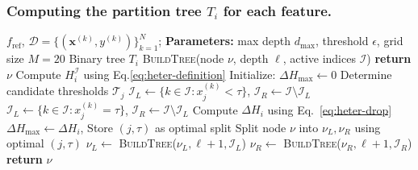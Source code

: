 \subsubsection{Computing the partition tree $T_i$ for each feature.}
\label{subsec:partition-tree}

\begin{algorithm}[tb]
\caption{Fitting a Partition Tree $T_i$ for Feature $x_i$}
\label{alg:fit-tree}
\begin{algorithmic}[1]
    $f_{\text{ref}}$, $\mathcal{D} = \{(\mathbf{x}^{(k)}, y^{(k)})\}_{k=1}^N$; {\bfseries Parameters:} max depth $d_{\max}$, threshold $\epsilon$, grid size $M=20$
    Binary tree $T_i$
   \STATE
    \textsc{BuildTree}(node $\nu$, depth $\ell$, active indices $\mathcal{I}$)
      \STATE \textbf{return} $\nu$ 
   \ENDIF
   \STATE Compute $H_i^{\mathcal{I}}$ using Eq.\eqref{eq:heter-definition}
   \STATE Initialize: $\Delta H_{\max} \leftarrow 0$
      \STATE Determine candidate thresholds $\mathcal{T}_j$ 
            \STATE $\mathcal{I}_L \leftarrow \{k \in \mathcal{I} : x_j^{(k)} < \tau\}$, $\mathcal{I}_R \leftarrow \mathcal{I} \setminus \mathcal{I}_L$
        \ELSE[$x_j$ is categorical]
            \STATE $\mathcal{I}_L \leftarrow \{k \in \mathcal{I} : x_j^{(k)} = \tau\}$, $\mathcal{I}_R \leftarrow \mathcal{I} \setminus \mathcal{I}_L$
        \ENDIF
         \STATE Compute $\Delta H_i$ using Eq.~\eqref{eq:heter-drop}
            \STATE $\Delta H_{\max} \leftarrow \Delta H_i$, Store $(j, \tau) $ as optimal split
         \ENDIF
      \ENDFOR
   \ENDFOR
      \STATE Split node $\nu$ into $\nu_L, \nu_R$ using optimal $(j, \tau)$
      \STATE $\nu_L \leftarrow$ \textsc{BuildTree}($\nu_L, \ell + 1, \mathcal{I}_L$)
      \STATE $\nu_R \leftarrow$ \textsc{BuildTree}($\nu_R, \ell + 1, \mathcal{I}_R$)
   \ENDIF
   \STATE \textbf{return} $\nu$
\end{algorithmic}
\end{algorithm}

